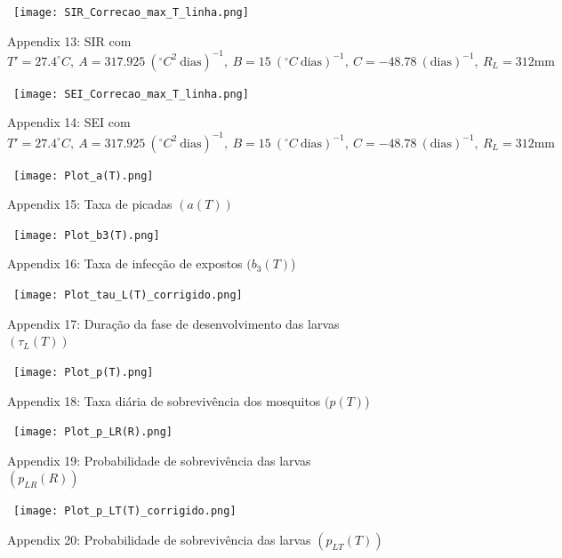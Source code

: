 \documentclass[
	12pt,				%
	oneside,			%
	a4paper,			%
	english,			%
	brazil				%
	]{abntex2}
\begin{document}
\begin{apendicesenv}
\begin{figure}[!ht]
	\centering
	\hbox{\hspace{4.0em} \texttt{[image: SIR\_Correcao\_max\_T\_linha.png]}}
	\caption*{Appendix 13: SIR com $T'=27.4^\circ C, \ A=317.925 \ (^\circ C^2 \ \text{dias})^{-1}, \ B=15 \ (^\circ C \ \text{dias})^{-1}, \ C=-48.78 \ (\text{dias})^{-1}, \ R_L=312 \text{mm}$}
\end{figure} 
\begin{figure}[!ht]
	\centering
	\hbox{\hspace{3.0em} \texttt{[image: SEI\_Correcao\_max\_T\_linha.png]}}
	\caption*{Appendix 14: SEI com $T'=27.4^\circ C, \ A=317.925 \ (^\circ C^2 \ \text{dias})^{-1}, \ B=15 \ (^\circ C \ \text{dias})^{-1}, \ C=-48.78 \ (\text{dias})^{-1}, \ R_L=312 \text{mm}$}
\end{figure}
\newpage
\begin{figure}[!ht]
	\centering
	\hbox{\hspace{4.0em} \texttt{[image: Plot\_a(T).png]}}
	\caption*{Appendix 15: Taxa de picadas $(a(T))$} 
\end{figure} 
\begin{figure}[!ht]
	\centering
	\hbox{\hspace{4.0em} \texttt{[image: Plot\_b3(T).png]}}
	\caption*{Appendix 16: Taxa de infecção de expostos $(b_3(T)$)} 
\end{figure} 
\newpage
\begin{figure}[!ht]
	\centering
	\hbox{\hspace{2.3em} \texttt{[image: Plot\_tau\_L(T)\_corrigido.png]}}
	\caption*{Appendix 17: Duração da fase de desenvolvimento das larvas $(\tau_L(T))$} 
\end{figure} 
\begin{figure}[!ht]
	\centering
	\hbox{\hspace{2.5em} \texttt{[image: Plot\_p(T).png]}}
	\caption*{Appendix 18: Taxa diária de sobrevivência dos mosquitos $(p(T)$)} 
\end{figure} 
\newpage
\begin{figure}[!ht]
	\centering
	\hbox{\hspace{3.0em} \texttt{[image: Plot\_p\_LR(R).png]}}
	\caption*{Appendix 19: Probabilidade de sobrevivência das larvas $(p_{LR}(R))$} 
\end{figure} 
\begin{figure}[!ht]
	\centering
	\hbox{\hspace{2.5em} \texttt{[image: Plot\_p\_LT(T)\_corrigido.png]}}
	\caption*{Appendix 20: Probabilidade de sobrevivência das larvas $(p_{LT}(T))$} 
\end{figure} 

\end{apendicesenv}
\end{document}
